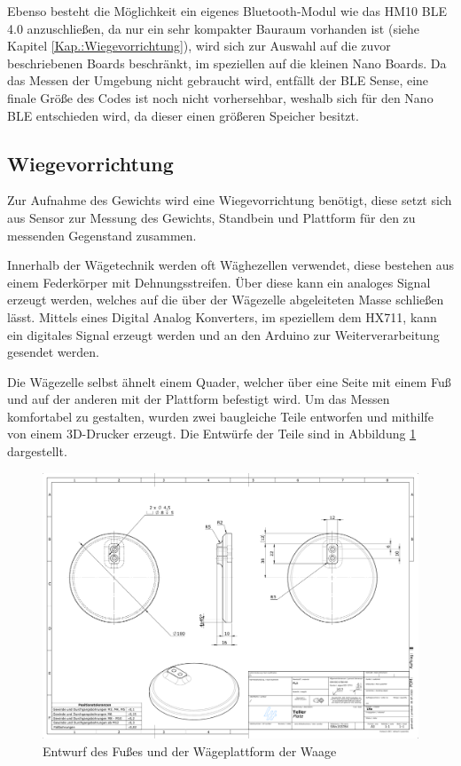 Ebenso besteht die Möglichkeit ein eigenes Bluetooth-Modul wie das  HM10 BLE 4.0 anzuschließen, da nur ein sehr kompakter Bauraum vorhanden ist (siehe Kapitel \ref{Kap.:Wiegevorrichtung}), wird sich zur Auswahl auf die zuvor beschriebenen Boards beschränkt, im speziellen auf die kleinen Nano Boards. Da das Messen der Umgebung nicht gebraucht wird, entfällt der BLE Sense, eine finale Größe des Codes ist noch nicht vorhersehbar, weshalb sich für den Nano BLE entschieden wird, da dieser einen größeren Speicher besitzt. 


\subsection{Wiegevorrichtung\label{Kap.:Wiegevorrichtung}} 

Zur Aufnahme des Gewichts wird eine Wiegevorrichtung benötigt, diese setzt sich aus Sensor zur Messung des Gewichts, Standbein und Plattform für den zu messenden Gegenstand zusammen. 

Innerhalb der Wägetechnik werden oft Wäghezellen verwendet, diese bestehen aus einem Federkörper mit Dehnungsstreifen. Über diese kann ein analoges Signal erzeugt werden, welches auf die über der Wägezelle abgeleiteten Masse schließen lässt. Mittels eines Digital Analog Konverters, im speziellem dem HX711, kann ein digitales Signal erzeugt werden und an den Arduino zur Weiterverarbeitung gesendet werden.

Die Wägezelle selbst ähnelt einem Quader, welcher über eine Seite mit einem Fuß und auf der anderen mit der Plattform befestigt wird. Um das Messen komfortabel zu gestalten, wurden zwei baugleiche Teile entworfen und mithilfe von einem 3D-Drucker erzeugt. Die Entwürfe der Teile sind in Abbildung \ref{fig.:3D-Druck} dargestellt.

\begin{figure}[hbtp]
	\centering
	\includegraphics[width=1\textwidth]{Bilder/Teller-1.pdf}
	\caption{Entwurf des Fußes und der Wägeplattform der Waage}
	\label{fig.:3D-Druck}
\end{figure} 

